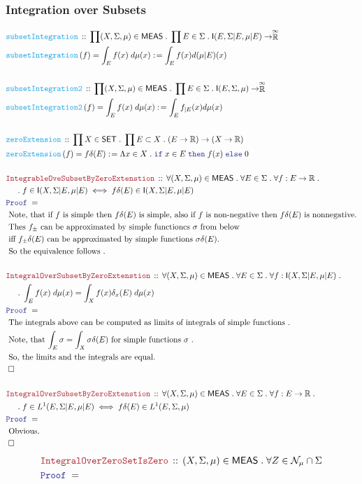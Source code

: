 \documentclass[12pt]{scrartcl}
\newcommand{\FUNC}[1]{\textcolor{Cerulean}{\mathtt{#1}}}
\newcommand{\LOGIC}[1]{\textcolor{Blue}{\mathtt{#1}}}
\newcommand{\THM}[1]{\textcolor{Maroon}{\mathtt{#1}}}
\renewcommand{\.}{\; . \;}
\newcommand{\de}{: \kern 0.1pc =}
\newcommand{\If}{\LOGIC{if} \;}
\newcommand{\Then}{ \; \LOGIC{then} \;}
\newcommand{\Else}{\; \LOGIC{else} \;}
\newcommand{\Act}[1]{\left( #1 \right)}
\newcommand{\Theorem}[2]{& \THM{#1} \, :: \, #2 \\ & \Proof = \\ }
\newcommand{\DeclareFunc}[2]{& \FUNC{#1} \, :: \, #2 \\}
\newcommand{\DefineNamedFunc}[4]{&  \FUNC{#1}\Act{#2} = #3 \de #4 \\}
\newcommand{\NewLine}{\\ & \kern 1pc}
\newcommand{\Page}[1]{ \begin{align*} #1 \end{align*}   }
\newcommand{\Reals}{\mathbb{R} }
\newcommand{\EReals}{\stackrel{\mathclap{\infty}}{\mathbb{R}}}
\newcommand{\QED}{\; \square}
\newcommand{\EndProof}{& \QED \\}
\newcommand{\Proof}{\LOGIC{Proof} \; }
\newcommand{\Explain}[1]{& \text{#1.} \\}
\newcommand{\ExplainFurther}[1]{& \text{#1} \\}
\newcommand{\SET}{\mathsf{SET}}
\newcommand{\Null}{\mathcal{N}}
\newcommand{\Integrable}{\mathsf{I}}
\newcommand{\MEAS}{\mathsf{MEAS}}
\begin{document}
\subsubsection{Integration over Subsets}
\Page{
	\DeclareFunc{subsetIntegration}
	{
		\prod (X,\Sigma,\mu) \in \MEAS \.
		\prod E \in \Sigma \. 
		\Integrable(E,\Sigma|E,\mu|E) \to \EReals
	}
	\DefineNamedFunc{subsetIntegration}{f}{\int_E f(x) \; d\mu(x)}
	{
		\int_E f(x) d(\mu|E)(x)	
	}
	\\
	\DeclareFunc{subsetIntegration2}
	{
		\prod (X,\Sigma,\mu) \in \MEAS \.
		\prod E \in \Sigma \. 
		\Integrable(E,\Sigma,\mu) \to \EReals
	}
	\DefineNamedFunc{subsetIntegration2}{f}{\int_E f(x) \; d\mu(x)}
	{
		\int_E f_{|E}(x) d\mu(x)	
	}
	\\
	\DeclareFunc{zeroExtension}
	{
		\prod X \in \SET \.
		\prod E \subset X \. 
		(E \to \Reals) \to (X \to \Reals)
	}
	\DefineNamedFunc{zeroExtension}{f}{f\delta(E)}
	{
		\Lambda x \in X \. \If x \in E \Then f(x) \Else 0
	}
	\\
	\Theorem{IntegrableOveSubsetByZeroExtenstion}
	{
		\forall  (X,\Sigma,\mu) \in \MEAS \.
		\forall E \in \Sigma \.
		\forall f : E \to \Reals \. \NewLine \.
		f \in \Integrable(X,\Sigma|E,\mu|E) 
		\iff
		f\delta(E) \in \Integrable(X,\Sigma|E,\mu|E)
	}
	\Explain{ Note, that if $f$ is simple then $f\delta(E)$ is simple, 
		also  if $f$ is  non-negative then $f\delta(E)$ is nonnegative}
	\ExplainFurther{
		Thes $f_{\pm}$ can be approximated by simple functioncs $\sigma$ from below}
	\Explain{
		iff  $f_{\pm} \delta(E)$ can be approximated by simple functions $\sigma \delta(E)$}
	\Explain{
		So the equivalence follows
	}
	\\
	\Theorem{IntegralOverSubsetByZeroExtenstion}
	{
		\forall  (X,\Sigma,\mu) \in \MEAS \.
		\forall E \in \Sigma \.
		\forall f : \Integrable(X,\Sigma|E,\mu|E) \. \NewLine \.
		\int_E f(x) \; d\mu(x) = \int_X f(x)\delta_x(E) \; d\mu(x)
	}
	\Explain{
		The integrals above can be computed as limits of integrals of simple functions 
	}
	\Explain{
		Note, that  $\int_E \sigma = \int_X \sigma \delta(E)$ for simple functions $\sigma$
	}
	\Explain{
		So, the limits and the integrals are equal}
	\EndProof
	\\
	\Theorem{IntegralOverSubsetByZeroExtenstion}
	{
		\forall  (X,\Sigma,\mu) \in \MEAS \.
		\forall E \in \Sigma \.
		\forall f : E \to \Reals \. \NewLine \.
		f \in L^1(E,\Sigma|E,\mu|E) \iff f\delta(E) \in L^1(E,\Sigma,\mu)
	}
	\Explain{ Obvious}
	\EndProof
}\Page{
	\Theorem{IntegralOverZeroSetIsZero}
	{
		(X,\Sigma,\mu) \in \MEAS \.
		\forall Z \in \Null_\mu \cap \Sigma
}}
\end{document}
